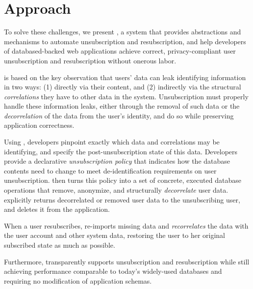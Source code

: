 \section{Approach}
To solve these challenges, we present \sys, a system that provides
abstractions and mechanisms to automate unsubscription and resubscription, and 
help developers of databased-backed web applications achieve correct, privacy-compliant user
unsubscription and resubscription without onerous labor.

\sys is based on the key observation that users' data can leak identifying information in two ways:
(1) directly via their content, and (2) indirectly via the structural \emph{correlations} they have
to other data in the system. 
Unsubscription must properly handle these information leaks, either through the removal of such data
or the \emph{decorrelation} of the data from the user's identity, and do so while preserving
application correctness.

%
Using \sys, developers pinpoint exactly which data and correlations may be identifying, and
specify the post-unsubscription state of this data. Developers provide a declarative
\emph{unsubscription policy} that indicates how the database contents need to change to meet
de-identification requirements on user unsubscription.
%
\sys then turns this policy into a set of concrete, executed database operations that remove,
anonymize, and structurally \emph{decorrelate} user data. \sys explicitly returns decorrelated or
removed user data to the unsubscribing user, and deletes it from the application.
%

%
When a user resubscribes, \sys re-imports missing data and \emph{recorrelates} the data with the
user account and other system data, restoring the user to her original subscribed state as much as
possible.

Furthermore, \sys transparently supports unsubscription and resubscription while still achieving performance
comparable to today’s widely-used databases and requiring no modification of application schemas.
